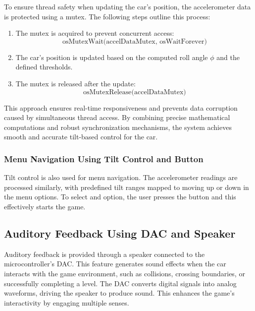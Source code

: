 \documentclass[conference]{IEEEtran}
\begin{document}
To ensure thread safety when updating the car's position, the accelerometer data is protected using a mutex. The following steps outline this process:
\begin{enumerate}
    \item The mutex is acquired to prevent concurrent access:
    \begin{equation}
    \text{osMutexWait(accelDataMutex, osWaitForever)}
    \end{equation}

    \item The car's position is updated based on the computed roll angle $\phi$ and the defined thresholds.

    \item The mutex is released after the update:
    \begin{equation}
    \text{osMutexRelease(accelDataMutex)}
    \end{equation}
\end{enumerate}

This approach ensures real-time responsiveness and prevents data corruption caused by simultaneous thread access. By combining precise mathematical computations and robust synchronization mechanisms, the system achieves smooth and accurate tilt-based control for the car.


\subsubsection{Menu Navigation Using Tilt Control and Button}
Tilt control is also used for menu navigation. The accelerometer readings are processed similarly, with predefined tilt ranges mapped to moving up or down in the menu options. To select and option, the user presses the button and this effectively starts the game.

\subsection{Auditory Feedback Using DAC and Speaker}
Auditory feedback is provided through a speaker connected to the microcontroller's DAC. This feature generates sound effects when the car interacts with the game environment, such as collisions, crossing boundaries, or successfully completing a level. The DAC converts digital signals into analog waveforms, driving the speaker to produce sound. This enhances the game’s interactivity by engaging multiple senses.
\end{document}

